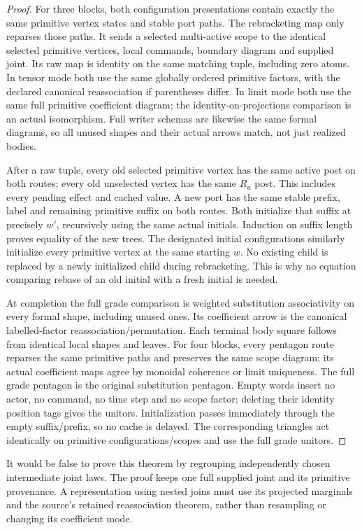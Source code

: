\documentclass[11pt]{article}
\begin{document}
\begin{proof}
For three blocks, both configuration presentations contain exactly the same primitive vertex states and stable port paths. The rebracketing map only reparses those paths. It sends a selected multi-active scope to the identical selected primitive vertices, local commands, boundary diagram and supplied joint. Its raw map is identity on the same matching tuple, including zero atoms. In tensor mode both use the same globally ordered primitive factors, with the declared canonical reassociation if parentheses differ. In limit mode both use the same full primitive coefficient diagram; the identity-on-projections comparison is an actual isomorphism. Full writer schemas are likewise the same formal diagrams, so all unused shapes and their actual arrows match, not just realized bodies.

After a raw tuple, every old selected primitive vertex has the same active post on both routes; every old unselected vertex has the same $R_u$ post. This includes every pending effect and cached value. A new port has the same stable prefix, label and remaining primitive suffix on both routes. Both initialize that suffix at precisely $w'$, recursively using the same actual initials. Induction on suffix length proves equality of the new trees. The designated initial configurations similarly initialize every primitive vertex at the same starting $w$. No existing child is replaced by a newly initialized child during rebracketing. This is why no equation comparing rebase of an old initial with a fresh initial is needed.

At completion the full grade comparison is weighted substitution associativity on every formal shape, including unused ones. Its coefficient arrow is the canonical labelled-factor reassociation/permutation. Each terminal body square follows from identical local shapes and leaves. For four blocks, every pentagon route reparses the same primitive paths and preserves the same scope diagram; its actual coefficient maps agree by monoidal coherence or limit uniqueness. The full grade pentagon is the original substitution pentagon. Empty words insert no actor, no command, no time step and no scope factor; deleting their identity position tags gives the unitors. Initialization passes immediately through the empty suffix/prefix, so no cache is delayed. The corresponding triangles act identically on primitive configurations/scopes and use the full grade unitors.\end{proof}
It would be false to prove this theorem by regrouping independently chosen intermediate joint laws. The proof keeps one full supplied joint and its primitive provenance. A representation using nested joins must use its projected marginals and the source's retained reassociation theorem, rather than resampling or changing its coefficient mode.
\end{document}
